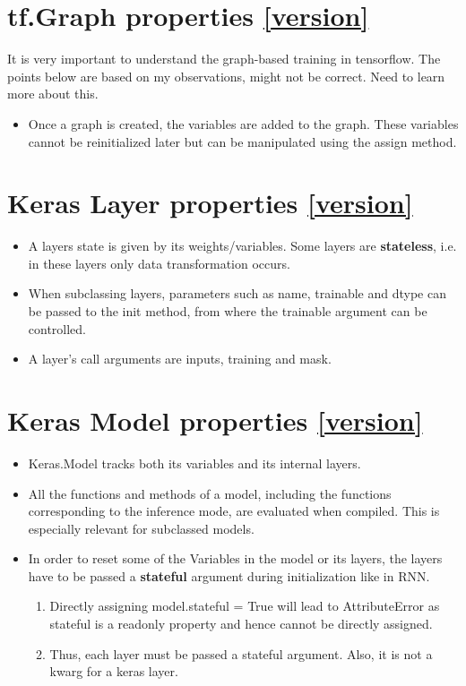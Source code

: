 \documentclass[11pt]{article}
\begin{document}
\begin{multicols*}{2}
\section{tf.Graph properties  \autoref{version}}
It is very important to understand the graph-based training in tensorflow. The points below are based on my observations, might not be correct. Need to learn more about this.
\begin{itemize}
\item Once a graph is created, the variables are added to the graph. These variables cannot be reinitialized later but can be manipulated using the assign method.
\end{itemize}

\section{Keras Layer properties  \autoref{version}}
\begin{itemize}
\item A layers state is given by its weights/variables. Some layers are \textbf{stateless}, i.e. in these layers only data transformation occurs.
\item When subclassing layers, parameters such as name, trainable and dtype can be passed to the init method, from where the trainable argument can be controlled.
\item A layer's call arguments are inputs, training and mask.
\end{itemize}


\section{Keras Model properties  \autoref{version}}
\begin{itemize}
\item Keras.Model tracks both its variables and its internal layers.
\item All the functions and methods of a model, including the functions corresponding to the inference mode, are evaluated when compiled. This is especially relevant for subclassed models.
\item In order to reset some of the Variables in the model or its layers, the layers have to be passed a \textbf{stateful} argument during initialization like in RNN.
	\begin{enumerate}
	\item Directly assigning model.stateful = True will lead to AttributeError as stateful is a readonly property and hence cannot be directly assigned.
	\item Thus, each layer must be passed a stateful argument. Also, it is not a kwarg for a keras layer.
	\end{enumerate}
	

\end{itemize}
\end{multicols*}
\end{document}
